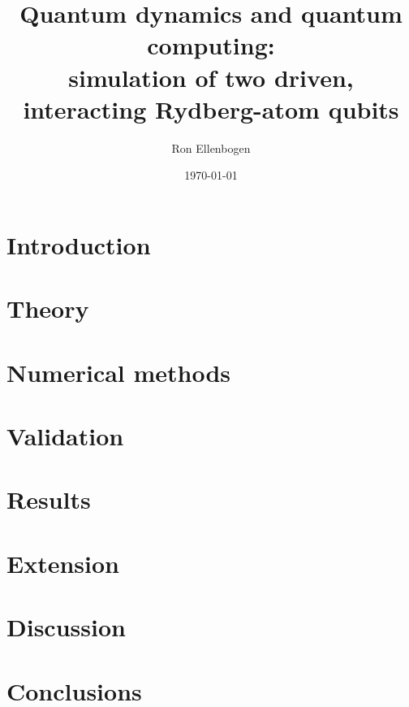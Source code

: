 \documentclass[11pt,a4paper]{article}
\title{Quantum dynamics and quantum computing:\\
  simulation of two driven, interacting Rydberg-atom qubits}
\author{Ron Ellenbogen}
\date{\today}
\begin{document}
\maketitle




\section{Introduction}\label{sec:introduction}


\section{Theory}\label{sec:theory}


\section{Numerical methods}\label{sec:methods}


\section{Validation}\label{sec:validation}


\section{Results}\label{sec:results}


\section{Extension}\label{sec:extension}


\section{Discussion}\label{sec:discussion}


\section{Conclusions}\label{sec:conclusions}


\printbibliography
\end{document}
